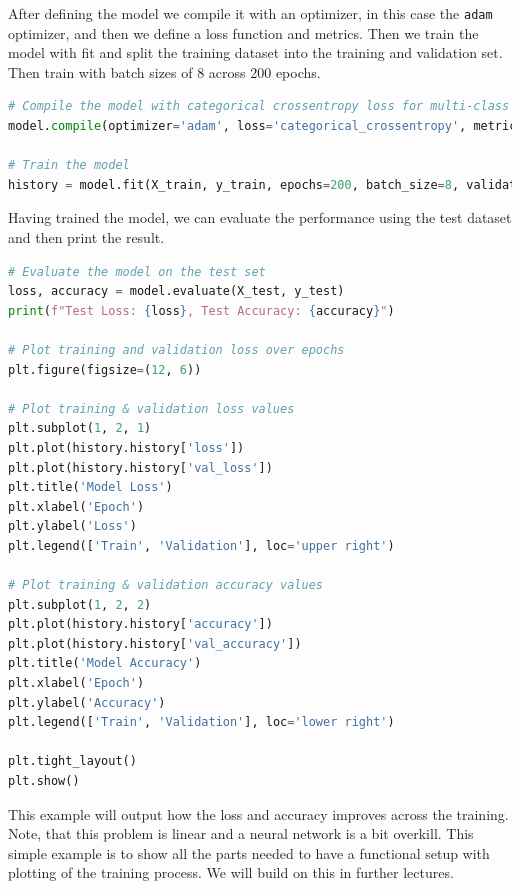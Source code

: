 \documentclass[12pt,a4paper]{article} %
\numberwithin{equation}{section}
\begin{document}
			After defining the model we compile it with an optimizer, in this case the \texttt{adam} optimizer, and then we define a loss function and metrics. Then we train the model with fit and split the training dataset into the training and validation set. Then train with batch sizes of 8 across 200 epochs.
			\begin{lstlisting}[language=Python]
# Compile the model with categorical crossentropy loss for multi-class classification
model.compile(optimizer='adam', loss='categorical_crossentropy', metrics=['accuracy'])

# Train the model
history = model.fit(X_train, y_train, epochs=200, batch_size=8, validation_split=0.2)
			\end{lstlisting}
			Having trained the model, we can evaluate the performance using the test dataset and then print the result.
			\begin{lstlisting}[language=Python]
# Evaluate the model on the test set
loss, accuracy = model.evaluate(X_test, y_test)
print(f"Test Loss: {loss}, Test Accuracy: {accuracy}")

# Plot training and validation loss over epochs
plt.figure(figsize=(12, 6))

# Plot training & validation loss values
plt.subplot(1, 2, 1)
plt.plot(history.history['loss'])
plt.plot(history.history['val_loss'])
plt.title('Model Loss')
plt.xlabel('Epoch')
plt.ylabel('Loss')
plt.legend(['Train', 'Validation'], loc='upper right')

# Plot training & validation accuracy values
plt.subplot(1, 2, 2)
plt.plot(history.history['accuracy'])
plt.plot(history.history['val_accuracy'])
plt.title('Model Accuracy')
plt.xlabel('Epoch')
plt.ylabel('Accuracy')
plt.legend(['Train', 'Validation'], loc='lower right')

plt.tight_layout()
plt.show()
			\end{lstlisting}
			This example will output how the loss and accuracy improves across the training. Note, that this problem is linear and a neural network is a bit overkill. This simple example is to show all the parts needed to have a functional setup with plotting of the training process. We will build on this in further lectures.
\end{document}
